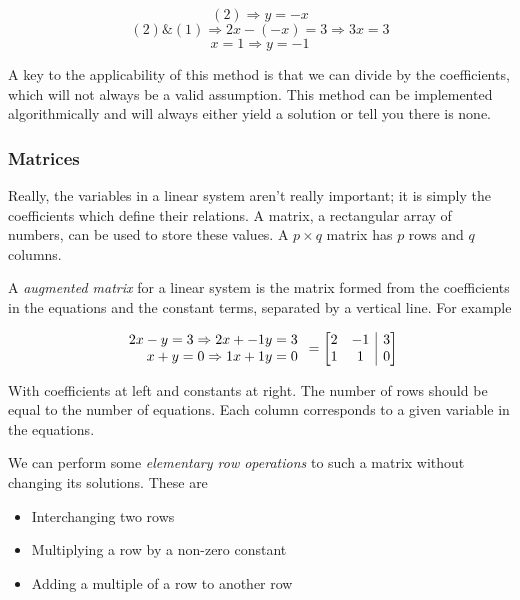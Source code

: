 \documentclass[12pt]{report}
\makeatletter
\newenvironment{amatrix}[1]{%
  \left[\begin{array}{@{}*{#1}{c}|c@{}}
}{%
  \end{array}\right]
}
\makeatother
\begin{document}
\begin{flushleft}
\[(2) \Rightarrow y = -x\]
\[(2) \& (1) \Rightarrow 2x - (-x) = 3 \Rightarrow 3x = 3\]
\[x = 1 \Rightarrow y = -1\]

A key to the applicability of this method is that we can divide by the
coefficients, which will not always be a valid assumption. This method can
be implemented algorithmically and will always either yield a solution or tell
you there is none.

\subsubsection*{Matrices}

Really, the variables in a linear system aren't really important; it is simply
the coefficients which define their relations. A matrix, a rectangular array of
numbers, can be used to store these values. A \(p \times q\) matrix has \(p\)
rows and \(q\) columns.

A \textit{augmented matrix} for a linear system is the matrix formed from the
coefficients in the equations and the constant terms, separated by a vertical
line. For example

\[
    \begin{array}{r}
        2x - y = 3 \Rightarrow 2x + -1y = 3 \\
        x + y = 0 \Rightarrow 1x + 1y = 0
    \end{array}
    =
    \begin{amatrix}{2}
        2 & -1 & 3 \\ 1 & 1 & 0
    \end{amatrix}
\]

With coefficients at left and constants at right. The number of rows should be
equal to the number of equations. Each column corresponds to a given variable
in the equations.

We can perform some \textit{elementary row operations} to such a matrix without
changing its solutions. These are
\begin{itemize}
    \item Interchanging two rows
    \item Multiplying a row by a non-zero constant
    \item Adding a multiple of a row to another row
\end{itemize}

\end{flushleft}
\end{document}

